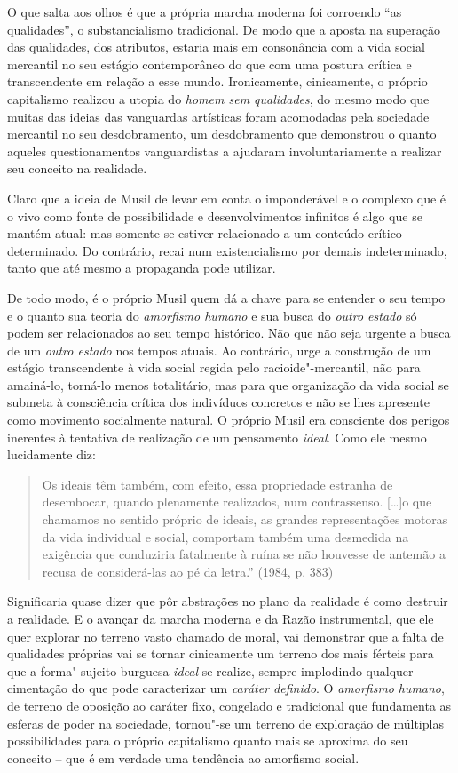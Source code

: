 O que salta aos olhos é que a própria marcha moderna foi corroendo ``as
qualidades'', o substancialismo tradicional. De modo que a aposta na
superação das qualidades, dos atributos, estaria mais em consonância com
a vida social mercantil no seu estágio contemporâneo do que com uma
postura crítica e transcendente em relação a esse mundo. Ironicamente,
cinicamente, o próprio capitalismo realizou a utopia do \emph{homem sem
qualidades}, do mesmo modo que muitas das ideias das vanguardas
artísticas foram acomodadas pela sociedade mercantil no seu
desdobramento, um desdobramento que demonstrou o quanto aqueles
questionamentos vanguardistas a ajudaram involuntariamente a realizar
seu conceito na realidade.

Claro que a ideia de Musil de levar em conta o imponderável e o complexo
que é o vivo como fonte de possibilidade e desenvolvimentos infinitos é
algo que se mantém atual: mas somente se estiver relacionado a um
conteúdo crítico determinado. Do contrário, recai num existencialismo por
demais indeterminado, tanto que até mesmo a propaganda pode utilizar.

De todo modo, é o próprio Musil quem dá a chave para se entender o seu
tempo e o quanto sua teoria do \emph{amorfismo humano} e sua busca do
\emph{outro estado} só podem ser relacionados ao seu tempo histórico.
Não que não seja urgente a busca de um \emph{outro estado} nos tempos
atuais. Ao contrário, urge a construção de um estágio transcendente à
vida social regida pelo racioide"-mercantil, não para amainá-lo, torná-lo
menos totalitário, mas para que organização da vida social se submeta à
consciência crítica dos indivíduos concretos e não se lhes apresente
como movimento socialmente natural. O próprio Musil era consciente dos
perigos inerentes à tentativa de realização de um pensamento
\emph{ideal}. Como ele mesmo lucidamente diz:

\begin{quote}
Os ideais têm também, com efeito, essa propriedade estranha de
desembocar, quando plenamente realizados, num contrassenso. [\ldots{}]o
que chamamos no sentido próprio de ideais, as grandes representações
motoras da vida individual e social, comportam também uma desmedida na
exigência que conduziria fatalmente à ruína se não houvesse de antemão a
recusa de considerá-las ao pé da letra.'' (1984, p. 383)
\end{quote}

Significaria quase dizer que pôr abstrações no plano da realidade é como
destruir a realidade. E o avançar da marcha moderna e da Razão
instrumental, que ele quer explorar no terreno vasto chamado de moral,
vai demonstrar que a falta de qualidades próprias vai se tornar
cinicamente um terreno dos mais férteis para que a forma"-sujeito
burguesa \emph{ideal} se realize, sempre implodindo qualquer cimentação
do que pode caracterizar um \emph{caráter definido}. O \emph{amorfismo}
\emph{humano}, de terreno de oposição ao caráter fixo, congelado e
tradicional que fundamenta as esferas de poder na sociedade, tornou"-se
um terreno de exploração de múltiplas possibilidades para o próprio
capitalismo quanto mais se aproxima do seu conceito -- que é em verdade
uma tendência ao amorfismo social.

